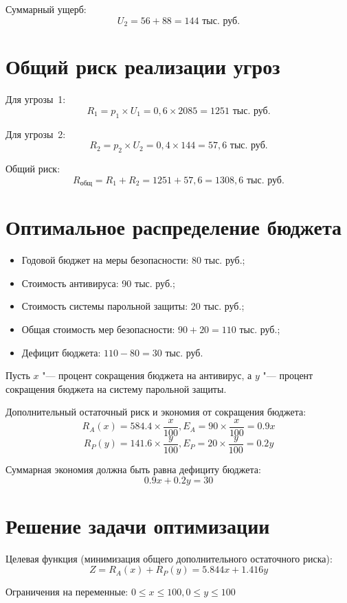 \documentclass{bsuir}
\begin{document}
Суммарный ущерб:
$$U_2 = 56 + 88 = 144\text{ тыс.~руб}.$$

\section{Общий риск реализации угроз}

Для угрозы~1:
$$R_1 = p_1 \times U_1 = 0{,}6 \times 2085 = 1251\text{ тыс.~руб}.$$

Для угрозы~2:
$$R_2 = p_2 \times U_2 = 0{,}4 \times 144 = 57{,}6\text{ тыс.~руб}.$$

Общий риск:
$$R_{\text{общ}} = R_1 + R_2 = 1251 + 57{,}6 = 1308{,}6\text{ тыс.~руб}.$$

\section{Оптимальное распределение бюджета}

\begin{itemize}
	\item Годовой бюджет на меры безопасности: 80 тыс. руб.;
	\item Стоимость антивируса: 90 тыс. руб.;
	\item Стоимость системы парольной защиты: 20 тыс. руб.;
	\item Общая стоимость мер безопасности: $90 + 20 = 110$ тыс. руб.;
	\item Дефицит бюджета: $110 - 80 = 30$ тыс. руб.
\end{itemize}

Пусть $x$ "--- процент сокращения бюджета на антивирус, а $y$ "--- процент сокращения бюджета на систему парольной
защиты.

Дополнительный остаточный риск и экономия от сокращения бюджета:
$$R_A(x) = 584.4 \times \frac{x}{100}, E_A = 90 \times \frac{x}{100} = 0.9x$$
$$R_P(y) = 141.6 \times \frac{y}{100}, E_P = 20 \times \frac{y}{100} = 0.2y$$

Суммарная экономия должна быть равна дефициту бюджета:
$$0.9x + 0.2y = 30$$

\section{Решение задачи оптимизации}

Целевая функция (минимизация общего дополнительного остаточного риска):
$$Z = R_A(x) + R_P(y) = 5.844x + 1.416y$$

Ограничения на переменные: $0 \le x \le 100, 0 \le y \le 100$
\end{document}
